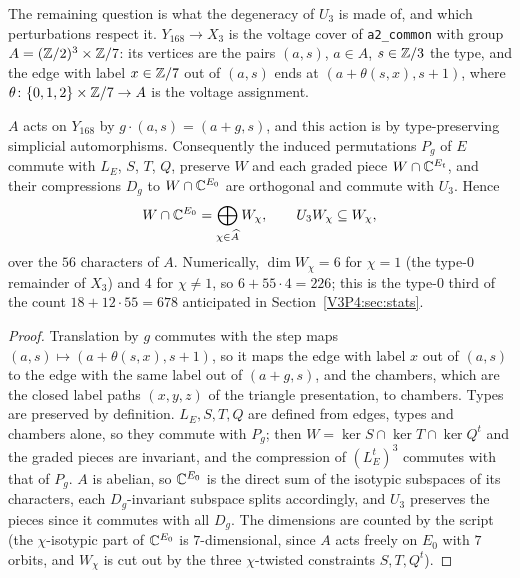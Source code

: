The remaining question is what the degeneracy of $U_3$ is made of, and which perturbations
respect it. $Y_{168}\to X_3$ is the voltage cover of \texttt{a2\_common} with group
$A=(\mathbb{Z}/2)^{3}\times\mathbb{Z}/7$: its vertices are the pairs $(a,s)$, $a\in A$, $s\in\mathbb{Z}/3$ the type, and
the edge with label $x\in\mathbb{Z}/7$ out of $(a,s)$ ends at $(a+\theta(s,x),s+1)$, where
$\theta\colon\{0,1,2\}\times\mathbb{Z}/7\to A$ is the voltage assignment.

\begin{proposition}\label{V3P4:prop:deck}
$A$ acts on $Y_{168}$ by $g\cdot(a,s)=(a+g,s)$, and this action is by type-preserving simplicial
automorphisms. Consequently the induced permutations $P_g$ of $E$ commute with $L_E$, $S$, $T$,
$Q$, preserve $W$ and each graded piece $W\cap\mathbb{C}^{E_t}$, and their compressions $D_g$ to
$W\cap\mathbb{C}^{E_0}$ are orthogonal and commute with $U_3$. Hence
\[
W\cap\mathbb{C}^{E_0}=\bigoplus_{\chi\in\widehat A}W_\chi,\qquad U_3W_\chi\subseteq W_\chi ,
\]
over the $56$ characters of $A$. Numerically, $\dim W_\chi=6$ for $\chi=1$ (the type-$0$ remainder of
$X_3$) and $4$ for $\chi\ne1$, so $6+55\cdot4=226$; this is the type-$0$ third of the count
$18+12\cdot55=678$ anticipated in Section~\ref{V3P4:sec:stats}.
\end{proposition}

\begin{proof}
Translation by $g$ commutes with the step maps $(a,s)\mapsto(a+\theta(s,x),s+1)$, so it maps the
edge with label $x$ out of $(a,s)$ to the edge with the same label out of $(a+g,s)$, and the
chambers, which are the closed label paths $(x,y,z)$ of the triangle presentation, to chambers.
Types are preserved by definition. $L_E,S,T,Q$ are defined from edges, types and chambers alone,
so they commute with $P_g$; then $W=\ker S\cap\ker T\cap\ker Q^{t}$ and the graded pieces are
invariant, and the compression of $(L_E^{t})^{3}$ commutes with that of $P_g$. $A$ is abelian, so
$\mathbb{C}^{E_0}$ is the direct sum of the isotypic subspaces of its characters, each $D_g$-invariant
subspace splits accordingly, and $U_3$ preserves the pieces since it commutes with all $D_g$. The
dimensions are counted by the script (the $\chi$-isotypic part of $\mathbb{C}^{E_0}$ is $7$-dimensional,
since $A$ acts freely on $E_0$ with $7$ orbits, and $W_\chi$ is cut out by the three
$\chi$-twisted constraints $S,T,Q^{t}$).
\end{proof}

